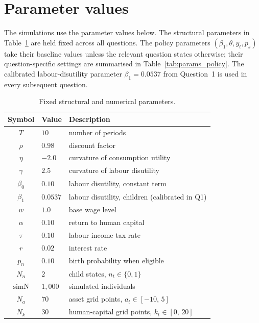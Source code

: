 \section{Parameter values}

The simulations use the parameter values below. The structural parameters in Table~\ref{tab:params_fixed} are held fixed across all questions. The policy parameters $(\beta_1,\theta,y_t,p_s)$ take their baseline values unless the relevant question states otherwise; their question-specific settings are summarised in Table~\ref{tab:params_policy}. The calibrated labour-disutility parameter $\beta_1=0.0537$ from Question~1 is used in every subsequent question.

\begin{table}[H]
\centering
\begin{tabular}{cll}
\hline
Symbol & Value & Description \\
\hline
$T$        & $10$    & number of periods \\
$\rho$     & $0.98$  & discount factor \\
$\eta$     & $-2.0$  & curvature of consumption utility \\
$\gamma$   & $2.5$   & curvature of labour disutility \\
$\beta_0$  & $0.10$  & labour disutility, constant term \\
$\beta_1$  & $0.0537$& labour disutility, children (calibrated in Q1) \\
$w$        & $1.0$   & base wage level \\
$\alpha$   & $0.10$  & return to human capital \\
$\tau$     & $0.10$  & labour income tax rate \\
$r$        & $0.02$  & interest rate \\
$p_n$      & $0.10$  & birth probability when eligible \\
$N_n$      & $2$     & child states, $n_t\in\{0,1\}$ \\
\hline
$\text{simN}$ & $1{,}000$ & simulated individuals \\
$N_a$      & $70$    & asset grid points, $a_t\in[-10,\,5]$ \\
$N_k$      & $30$    & human-capital grid points, $k_t\in[0,\,20]$ \\
\hline
\end{tabular}
\caption{Fixed structural and numerical parameters.}
\label{tab:params_fixed}
\end{table}

